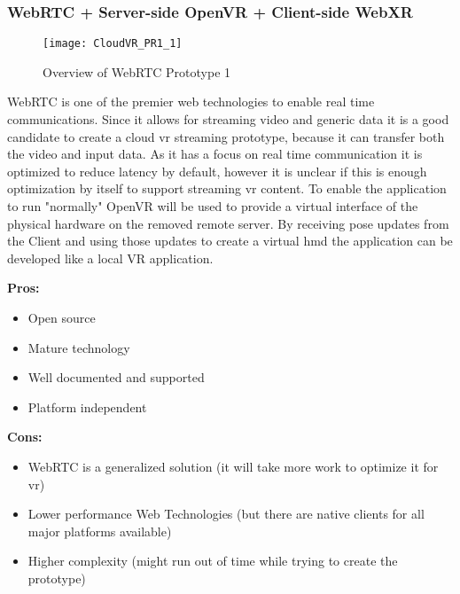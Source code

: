 \subsubsection{WebRTC + Server-side OpenVR + Client-side WebXR}
\begin{figure}[h!]
\caption{Overview of WebRTC Prototype 1}
\label{fig:pr11}
\texttt{[image: CloudVR\_PR1\_1]}
\end{figure}

WebRTC is one of the premier web technologies to enable real time communications. Since it allows for streaming video and generic data it is a good candidate to create a cloud \acrshort{vr} streaming prototype, because it can transfer both the video and input data. As it has a focus on real time communication it is optimized to reduce latency by default, however it is unclear if this is enough optimization by itself to support streaming \acrshort{vr} content. To enable the application to run "normally" OpenVR will be used to provide a virtual interface of the physical hardware on the removed remote server. By receiving pose updates from the Client and using those updates to create a virtual \acrshort{hmd} the application can be developed like a local VR application. \\
\newline
\begin{varwidth}[t]{.5\textwidth}
\renewcommand\labelitemi{+}
\textbf{Pros:}
\begin{itemize}
\item Open source
\item Mature technology
\item Well documented and supported
\item Platform independent
\end{itemize}
\end{varwidth}
\hspace{4em}
\begin{varwidth}[t]{.5\textwidth}
\renewcommand\labelitemi{-}
\textbf{Cons:}
\begin{itemize}
\item WebRTC is a generalized solution (it will take more work to optimize it for \acrshort{vr})
\item Lower performance Web Technologies (but there are native clients for all major platforms available)
\item Higher complexity (might run out of time while trying to create the prototype)
\end{itemize}
\end{varwidth}

